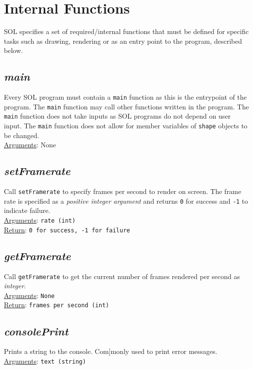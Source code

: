 \documentclass[letterpaper,12pt]{article}
\begin{document}
    \section{Internal Functions} \label{internal}
    SOL specifies a set of required/internal functions that must be defined for specific tasks such as drawing, rendering or as an entry point to the program, described below.
    
    \subsection{\textit{main}}
    Every SOL program must contain a \texttt{main} function as this is the entrypoint of the program. The \texttt{main} function may call other functions written in the program. The \texttt{main} function does not take inputs as SOL programs do not depend on user input. The \texttt{main} function does not allow for member variables of \texttt{shape} objects to be changed.\\
    \underline{Arguments}: None
    
    \subsection{\textit{setFramerate}}
    Call \texttt{setFramerate} to specify frames per second to render on screen. The frame rate is specified as a \textit{positive integer argument} and returns \texttt{0} for success and \texttt{-1} to indicate failure.\\
    \underline{Arguments}: \texttt{rate (int)}\\
    \underline{Return}: \texttt{0 for success, -1 for failure}
    
    \subsection{\textit{getFramerate}}
    Call \texttt{getFramerate} to get the current number of frames rendered per second as \textit{integer}.\\
    \underline{Arguments}: \texttt{None}\\
    \underline{Return}: \texttt{frames per second (int)}

    \subsection{\textit{consolePrint}}
    Prints a string to the console. Com]monly used to print error messages.\\
    \underline{Arguments}: \texttt{text (string)}
\end{document}
